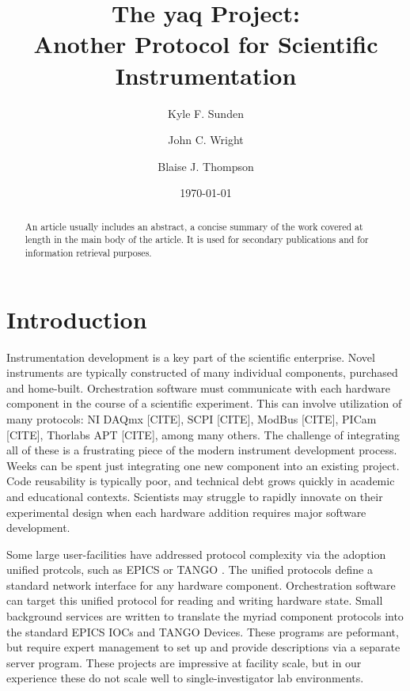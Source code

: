 \documentclass[aip, amsmath, amssymb, reprint,]{revtex4-1}
\begin{document}

\title{The yaq Project: \\ Another Protocol for Scientific Instrumentation}
\author{Kyle F. Sunden}
\author{John C. Wright}
\author{Blaise J. Thompson}

\date{\today}

\begin{abstract}
An article usually includes an abstract, a concise summary of the work
covered at length in the main body of the article. It is used for
secondary publications and for information retrieval purposes.
\end{abstract}

\maketitle

\section{Introduction}

Instrumentation development is a key part of the scientific enterprise.
Novel instruments are typically constructed of many individual components, purchased and home-built.
Orchestration software must communicate with each hardware component in the course of a scientific experiment.
This can involve utilization of many protocols: NI DAQmx [CITE], SCPI [CITE], ModBus [CITE], PICam [CITE], Thorlabs APT [CITE], among many others.
The challenge of integrating all of these is a frustrating piece of the modern instrument development process.
Weeks can be spent just integrating one new component into an existing project.
Code reusability is typically poor, and technical debt grows quickly in academic and educational contexts.
Scientists may struggle to rapidly innovate on their experimental design when each hardware addition requires major software development.

Some large user-facilities have addressed protocol complexity via the adoption unified protcols, such as EPICS \cite{DalesioLR1991a} or TANGO \cite{AGotz1999TANGOA}.
The unified protocols define a standard network interface for any hardware component.
Orchestration software can target this unified protocol for reading and writing hardware state.
Small background services are written to translate the myriad component protocols into the standard EPICS IOCs and TANGO Devices.
These programs are peformant, but require expert management to set up and provide descriptions via a separate server program.
These projects are impressive at facility scale, but in our experience these do not scale well to single-investigator lab environments.
\end{document}
